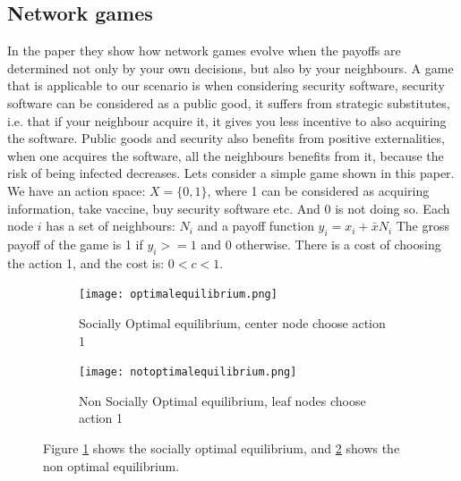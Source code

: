 \subsection{Network games}
In the paper \cite{networkgames} they show how network games evolve when the payoffs are determined not only by your own decisions, but also by your neighbours. 
A game that is applicable to our scenario is when considering security software, 
security software can be considered as a public good, it suffers from strategic substitutes, i.e. 
that if your neighbour acquire it, it gives you less incentive to also acquiring the software. 
Public goods and security also benefits from positive externalities, when one acquires the software, 
all the neighbours benefits from it, because the risk of being infected decreases.
Lets consider a simple game shown in this paper.
We have an action space: $X=\{0,1\}$, where 1 can be considered as acquiring information, take vaccine, buy security software etc. And 0 is not doing so.
Each node $i$ has a set of neighbours: $N_{i} $ and a payoff function $y_{i}=x_{i}+\bar{x}N_{i}$
The gross payoff of the game is 1 if $y_{i}>=1$ and 0 otherwise. There is a cost of choosing the action 1, and the cost is: $0<c<1$.
\begin{figure}[h]
\centering
\begin{subfigure}{.4\textwidth}
  \centering
  \texttt{[image: optimalequilibrium.png]}
  \caption{\label{fig:optequi} Socially Optimal equilibrium, center node choose action 1}
\end{subfigure}
\quad
\begin{subfigure}{.4\textwidth}
  \centering
  \texttt{[image: notoptimalequilibrium.png]}
  \caption{\label{fig:notoptequi} Non Socially Optimal equilibrium, leaf nodes choose action 1}
\end{subfigure}
\caption{\label{fig:starequi} Figure \ref{fig:optequi} shows the socially optimal equilibrium, and \ref{fig:notoptequi} shows the non optimal equilibrium.}

\end{figure}


